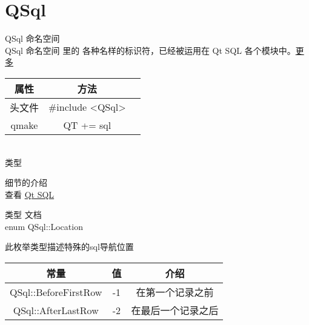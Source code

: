 \chapter{QSql}
QSql 命名空间\\

QSql 命名空间 里的 各种名样的标识符，已经被运用在 Qt SQL 各个模块中。\href{https://doc.qt.io/qt-5/qsql.html#details}{更多} \\

\begin{tabular}{|c|c|p{1.5cm}|}
	\hline
	属性 & 方法 \\
	\hline
	头文件 & \#include <QSql>\\      
	\hline
	qmake & QT += sql\\      
	\hline
\end{tabular}\\

类型



细节的介绍 \\

查看 \href{https://doc.qt.io/qt-5/qtsql-index.html}{Qt SQL}

类型 文档\\ 

enum QSql::Location


此枚举类型描述特殊的sql导航位置


\begin{tabular}{|c|c|c|}
	\hline
	常量	& 值 & 介绍 \\
	\hline
	QSql::BeforeFirstRow&-1&在第一个记录之前\\
	\hline
	QSql::AfterLastRow&-2&在最后一个记录之后\\
	\hline
\end{tabular}\\

